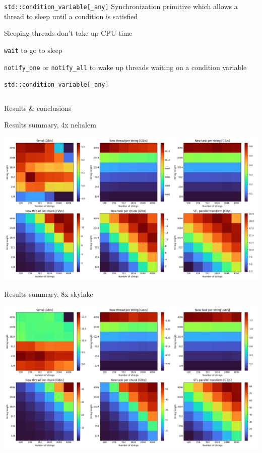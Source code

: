 \documentclass{beamer}
\begin{document}
\begin{frame}{\texttt{std::condition\_variable[\_any]}}
Synchronization primitive which allows a thread to sleep until a condition is satisfied

Sleeping threads don't take up CPU time

\texttt{wait} to go to sleep

\texttt{notify\_one} or \texttt{notify\_all} to wake up threads waiting on a condition variable
\end{frame}


\begin{frame}[fragile]{\texttt{std::condition\_variable[\_any]}}
\tiny
\inputminted{cpp}{../code/examples/example05.cpp}
\end{frame}

\begin{frame}[standout]
Results \& conclusions
\end{frame}

\begin{frame}{Results summary, 4x nehalem}
\begin{center}
\hspace{-0.65cm}
\includegraphics[width=1.05\textwidth, trim = {.25cm, 0cm, .6cm, 0cm}, clip]{nehalem_4cores_results.png}
\end{center}
\end{frame}

\begin{frame}{Results summary, 8x skylake}
\begin{center}
\hspace{-0.65cm}
\includegraphics[width=1.05\textwidth, trim = {.25cm, 0cm, .6cm, 0cm}, clip]{skylake_8cores_results.png}
\end{center}
\end{frame}
\end{document}
